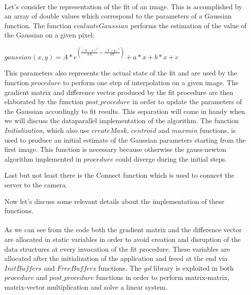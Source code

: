 \ \\Let's consider the representation of the fit of an image.
This is accomplished by an array of double values which correspond to the parameters of a Gaussian function.
The function $evaluateGaussian$ performs the estimation of the value of the Gaussian on a given pixel:
\begin{center}
	$gaussian(x,y) = A * e^{( \frac{(X-x)^2}{SX} + \frac{(Y-y)^2}{SY} )} +a*x +b*x +c$
\end{center} 
This parameters also represents the actual state of the fit and are used by the function $procedure$ to perform one step of interpolation on a given image.
The gradient matrix and difference vector produced by the fit procedure are then elaborated by the function $post\_procedure$ in order to update the parameters of the Gaussian accordingly to fit results.
This separation will come in handy when we will discuss the dataparallel implementation of the algorithm.
The function \textit{Initialization}, which also use $createMask$, $centroid$ and $maxmin$ functions, is used to produce an initial estimate of the Gaussian parameters starting from the first image.
This function is necessary because otherwise the gauss-newton algorithm implemented in $procedure$ could diverge during the initial steps.

Last but not least there is the Connect function which is used to connect the server to the camera.

Now let's discuss some relevant details about the implementation of these functions.
\ \\


\ \\As we can see from the code both the gradient matrix and the difference vector are allocated in static variables in order to avoid creation and disruption of the data structures at every invocation of the fit procedure. 
These variables are allocated after the initialization of the application and freed at the end via $InitBuffers$ and $FreeBuffers$ functions.
The \textit{gsl} library is exploited in both $procedure$ and $post\_procedure$ functions in order to perform matrix-matrix, matrix-vector multiplication and solve a linear system.

